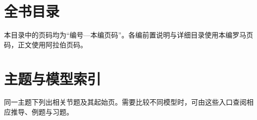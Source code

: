 \documentclass[UTF8,11pt,twoside,openany]{ctexbook}
\begin{document}
\chapter*{全书目录}
本目录中的页码均为“编号—本编页码”。各编前置说明与详细目录使用本编罗马页码，正文使用阿拉伯页码。

\chapter*{主题与模型索引}
同一主题下列出相关节题及其起始页。需要比较不同模型时，可由这些入口查阅相应推导、例题与习题。
\begingroup\small\linespread{1.1}\selectfont
\setlength{\parskip}{2pt}

\endgroup
\end{document}
